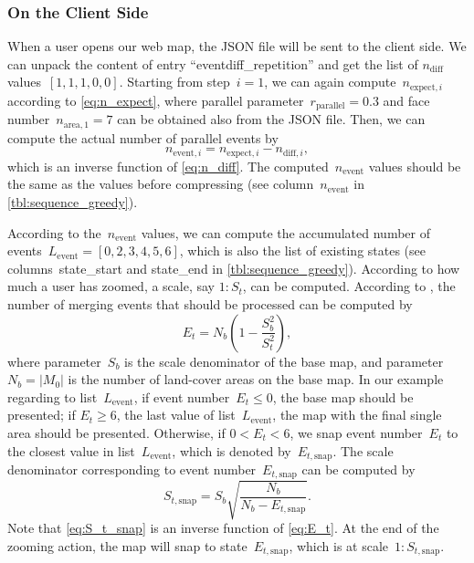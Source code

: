 \documentclass[ijgi,article,submit,moreauthors,pdftex]{Definitions/mdpi}
\begin{document}
\subsubsection{On the Client Side}
\label{sec:snap_client}


When a user opens our web map,
the JSON file will be sent to the client side.
We can unpack the content of entry ``eventdiff\_repetition'' and 
get the list of $n_\mathrm{diff}$ values~$[1, 1, 1, 0, 0]$.
Starting from step~$i=1$,
we can again compute~$n_{\mathrm{expect},i}$ according to \eq\ref{eq:n_expect},
where parallel parameter~$r_\mathrm{parallel}=0.3$ 
and face number~$n_{\mathrm{area},1} = 7$
can be obtained also from the JSON file.
Then, we can compute the actual number of parallel events by
\begin{equation*}
\label{eq:n_event_step}
n_{\mathrm{event},i} = n_{\mathrm{expect},i} - n_{\mathrm{diff},i},
\end{equation*}
which is an inverse function of \eq\ref{eq:n_diff}.
The computed~$n_\mathrm{event}$ values 
should be the same as the values before compressing
(see column~$n_\mathrm{event}$ in \tbl\ref{tbl:sequence_greedy}).

According to the~$n_\mathrm{event}$ values,
we can compute the accumulated number of events~$L_\mathrm{event} = 
[0, 2, 3, 4, 5, 6]$,
which is also the list of existing states
(see columns~state\_start and state\_end in \tbl\ref{tbl:sequence_greedy}).
According to how much a user has zoomed,
a scale, say $1:S_t$, can be computed.
According to \citet{Huang2016Webmap},
the number of merging events that should be processed can be computed by
\begin{equation}
\label{eq:E_t}
E_t = N_b \left(1-\frac{S^2_b}{S^2_t}\right),
\end{equation}
where parameter~$S_b$ is the scale denominator of the base map,
and parameter~$N_b = |M_0|$ is the number of land-cover areas on the base map.
In our example regarding to list~$L_\mathrm{event}$,
if event number~$E_t \le 0$, the base map should be presented;
if $E_t \ge 6$, the last value of list~$L_\mathrm{event}$,
the map with the final single area should be presented.
Otherwise, if $0<E_t < 6$, we snap event number~$E_t$ 
to the closest value in list~$L_\mathrm{event}$,
which is denoted by~$E_{t,\mathrm{snap}}$.
The scale denominator corresponding to event number~$E_{t,\mathrm{snap}}$
can be computed by 
\begin{equation}
\label{eq:S_t_snap}
S_{t,\mathrm{snap}} = S_b \sqrt{\frac{N_b}{N_b-E_{t,\mathrm{snap}}}}.
\end{equation}
Note that \eq\ref{eq:S_t_snap} is an inverse function of \eq\ref{eq:E_t}.
At the end of the zooming action, 
the map will snap to state~$E_{t,\mathrm{snap}}$,
which is at scale~$1:S_{t,\mathrm{snap}}$.
\end{document}
